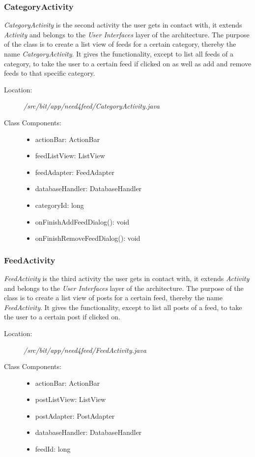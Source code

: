 \subsubsection{CategoryActivity}
\textit{CategoryActivity} is the second activity the user gets in contact with, it extends \textit{Activity} and belongs to the \textit{User Interfaces} layer of the architecture. The purpose of the class is to create a list view of feeds for a certain category, thereby the name \textit{CategoryActivity}. It gives the functionality, except to list all feeds of a category, to take the user to a certain feed if clicked on as well as add and remove feeds to that specific category.
\begin{description}
  \item[Location:] \textit{/src/bit/app/need4feed/CategoryActivity.java} \hfill
  \item[Class Components:] \hfill
     \begin{itemize}
        \item actionBar: ActionBar
        \item feedListView: ListView
        \item feedAdapter: FeedAdapter
        \item databaseHandler: DatabaseHandler
        \item categoryId: long
        \item onFinishAddFeedDialog(): void
        \item onFinishRemoveFeedDialog(): void
     \end{itemize}
\end{description}


\subsubsection{FeedActivity}
\textit{FeedActivity} is the third activity the user gets in contact with, it extends \textit{Activity} and belongs to the \textit{User Interfaces} layer of the architecture. The purpose of the class is to create a list view of posts for a certain feed, thereby the name \textit{FeedActivity}. It gives the functionality, except to list all posts of a feed, to take the user to a certain post if clicked on.
\begin{description}
  \item[Location:] \textit{/src/bit/app/need4feed/FeedActivity.java} \hfill
  \item[Class Components:] \hfill
     \begin{itemize}
        \item actionBar: ActionBar
        \item postListView: ListView
        \item postAdapter: PostAdapter
        \item databaseHandler: DatabaseHandler
        \item feedId: long
     \end{itemize}
\end{description}


